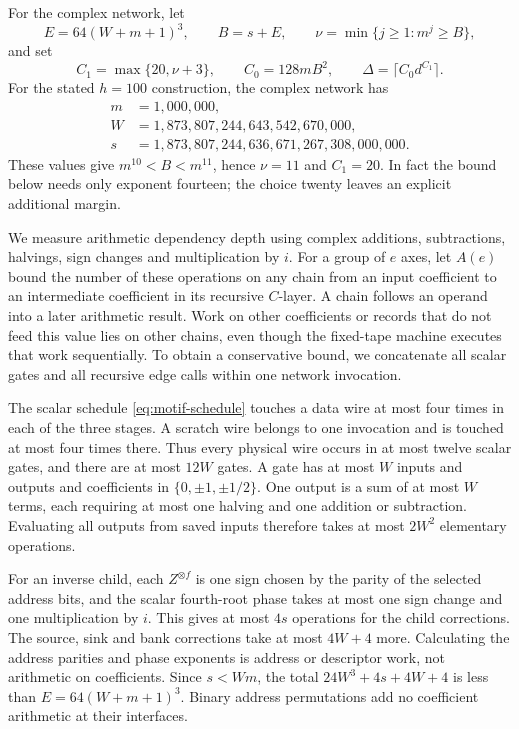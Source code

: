 \documentclass[11pt]{article}
\theoremstyle{definition}
\begin{document}
For the complex network, let
\[
 E=64(W+m+1)^3,\qquad B=s+E,
 \qquad \nu=\min\{j\ge1:m^j\ge B\},
\]
and set
\[
 C_1=\max\{20,\nu+3\},\qquad C_0=128mB^2,
 \qquad \Delta=\lceil C_0d^{C_1}\rceil.
\]
For the stated \(h=100\) construction, the complex network has
\[
\begin{split}
 m&=1{,}000{,}000,\\
 W&=1{,}873{,}807{,}244{,}643{,}542{,}670{,}000,\\
 s&=1{,}873{,}807{,}244{,}636{,}671{,}267{,}308{,}000{,}000.
\end{split}
\]
These values give \(m^{10}<B<m^{11}\), hence \(\nu=11\) and
\(C_1=20\).  In fact the bound below needs only exponent fourteen;
the choice twenty leaves an explicit additional margin.

We measure arithmetic dependency depth using complex additions,
subtractions, halvings, sign changes and multiplication by \(i\).
For a group of \(e\) axes, let \(A(e)\) bound the number of these
operations on any chain from an input coefficient to an intermediate
coefficient in its recursive \(C\)-layer.  A chain follows an operand
into a later arithmetic result.  Work on other coefficients or records
that do not feed this value lies on other chains, even though the
fixed-tape machine executes that work sequentially.  To obtain a
conservative bound, we concatenate all scalar gates and all recursive
edge calls within one network invocation.

The scalar schedule \eqref{eq:motif-schedule} touches a data wire
at most four times in each of the three stages.  A scratch wire belongs
to one invocation and is touched at most four times there.  Thus every
physical wire occurs in at most twelve scalar gates, and there are
at most \(12W\) gates.  A gate has at most \(W\) inputs and outputs
and coefficients in \(\{0,\pm1,\pm1/2\}\).  One output is a sum of
at most \(W\) terms, each requiring at most one halving and one
addition or subtraction.  Evaluating all outputs from saved inputs
therefore takes at most \(2W^2\) elementary operations.

For an inverse child, each \(Z^{\otimes f}\) is one sign chosen by
the parity of the selected address bits, and the scalar fourth-root
phase takes at most one sign change and one multiplication by \(i\).
This gives at most \(4s\) operations for the child corrections.
The source, sink and bank corrections take at most \(4W+4\) more.
Calculating the address parities and phase exponents is address or descriptor
work, not arithmetic on coefficients.  Since \(s<Wm\), the total
\(24W^3+4s+4W+4\) is less than
\(E=64(W+m+1)^3\).  Binary address permutations add no coefficient
arithmetic at their interfaces.
\end{document}
